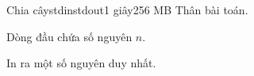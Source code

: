 \begin{problem}{Chia cây}{stdin}{stdout}{1 giây}{256 MB}
Thân bài toán.

\InputFile
Dòng đầu chứa số nguyên $n$.

\OutputFile
In ra một số nguyên duy nhất.
\end{problem}
